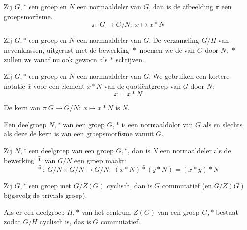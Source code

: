\documentclass[main.tex]{subfiles}
\begin{document}
\begin{st}
  Zij $G,*$ een groep en $N$ een normaaldeler van $G$, dan is de afbeelding $\pi$ een groepsmorfisme.
  \[ \pi:\ G \rightarrow G/N:\ x \mapsto x*N \]
  
\end{st}

\begin{de}
  Zij $G,*$ een groep en $N$ een normaaldeler van $G$.
  De verzameling $G/H$ van nevenklassen, uitgerust met de bewerking $\bar{*}$ noemen we de  van $G$ door $N$.
  $\bar{*}$ zullen we vanaf nu ook gewoon als $*$ schrijven.
\end{de}

\begin{de}
  Zij $G,*$ een groep en $N$ een normaaldeler van $G$.
  We gebruiken een kortere notatie $\bar{x}$ voor een element $x*N$ van de quoti\"entgroep van $G$ door $N$:
  \[ \bar{x} = x*N \]
\end{de}

\begin{ei}
  De kern van $\pi\ G \rightarrow G/N:\ x \mapsto x*N$ is $N$.
  
\end{ei}

\begin{gev}
  Een deelgroep $N,*$ van een groep $G,*$ is een normaaldolor van $G$ als en slechts als deze de kern is van een groepsmorfisme vanuit $G$.
  
\end{gev}

\begin{st}
  Zij $N,*$ een deelgroep van een groep $G,*$, dan is $N$ een normaaldeler als de bewerking $\bar{*}$ van $G/N$ een groep maakt:
  \[ \bar{*}:\ G/N \times G/N \rightarrow G/N:\ (x*N)\bar{*}(y*N) = (x*y)*N \]
  
\end{st}

\begin{st}
  Zij $G,*$ een groep met $G/Z(G)$ cyclisch, dan is $G$ commutatief (en $G/Z(G)$ bijgevolg de triviale groep).
  
\end{st}

\begin{st}
  Als er een deelgroep $H,*$ van het centrum $Z(G)$ van een groep $G,*$ bestaat zodat $G/H$ cyclisch is, das is $G$ commutatief.
  
\end{st}
\end{document}
